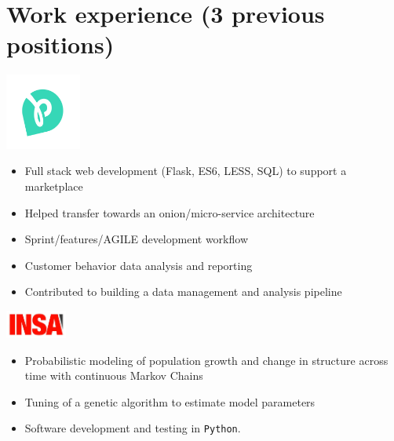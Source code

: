 \section{Work experience (3 previous positions)}

\noindent
\begin{minipage}{.15\textwidth}
\centerline{\includegraphics[width=25mm]{img/privateaser}}
\end{minipage}%
\hspace{5mm}
\begin{minipage}{.8\textwidth}
\raggedright
    \begin{itemize}
        \item Full stack web development (Flask, ES6, LESS, SQL) to support a marketplace
        \item Helped transfer towards an onion/micro-service architecture
        \item Sprint/features/AGILE development workflow
        \item Customer behavior data analysis and reporting
        \item Contributed to building a data management and analysis pipeline
    \end{itemize}
\end{minipage}

\noindent
\begin{minipage}{.15\textwidth}
\centerline{\includegraphics[width=20mm]{img/insa}}
\end{minipage}%
\hspace{5mm}
\begin{minipage}{.8\textwidth}
\raggedright
    \begin{itemize}
        \item Probabilistic modeling of population growth and change in structure across time with continuous Markov Chains
        \item Tuning of a genetic algorithm to estimate model parameters
        \item Software development and testing in \texttt{Python}.
    \end{itemize}
\end{minipage}

